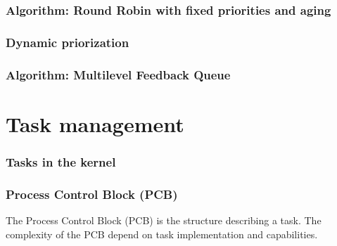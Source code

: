 
\begin{frame}
  \frametitle{Algorithm: Round Robin with fixed priorities and aging}
\end{frame}


\begin{frame}
  \frametitle{Dynamic priorization}
\end{frame}


\begin{frame}
  \frametitle{Algorithm: Multilevel Feedback Queue}
\end{frame}

%
%

\section{Task management}


\begin{frame}
  \frametitle{Tasks in the kernel}
\end{frame}


\begin{frame}
  \frametitle{Process Control Block (PCB)}

  The Process Control Block (PCB) is the structure describing a
  task. The complexity of the PCB depend on task implementation and
  capabilities.

\end{frame}


